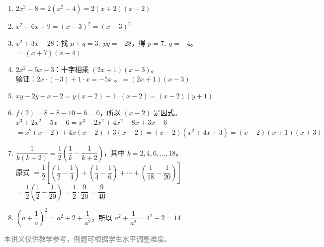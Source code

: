 \documentclass[12pt, a4paper]{ctexart}
\begin{document}
\vspace{10pt}
\begin{knowledgebox}[参考答案]
\begin{enumerate}[leftmargin=18pt, label=\textbf{\arabic*.}, itemsep=6pt]
\item $2x^2 - 8 = 2(x^2-4) = \boxed{2(x+2)(x-2)}$

\item $x^2 - 6x + 9 = (x-3)^2 = \boxed{(x-3)^2}$

\item $x^2 + 3x - 28$：找 $p+q=3,\; pq=-28$，得 $p=7,\; q=-4$。\\
$= \boxed{(x+7)(x-4)}$

\item $2x^2 - 5x - 3$：十字相乘 $(2x+1)(x-3)$。\\
验证：$2x\cdot(-3)+1\cdot x = -5x$ \checkmark。\quad $= \boxed{(2x+1)(x-3)}$

\item $xy - 2y + x - 2 = y(x-2) + 1\cdot(x-2) = \boxed{(x-2)(y+1)}$

\item $f(2) = 8+8-10-6 = 0$，所以 $(x-2)$ 是因式。\\
$x^3+2x^2-5x-6 = x^3-2x^2+4x^2-8x+3x-6$\\
$= x^2(x-2)+4x(x-2)+3(x-2) = (x-2)(x^2+4x+3) = \boxed{(x-2)(x+1)(x+3)}$

\item $\dfrac{1}{k(k+2)} = \dfrac{1}{2}\!\left(\dfrac{1}{k}-\dfrac{1}{k+2}\right)$，其中 $k=2,4,6,\ldots,18$。\\
原式 $= \dfrac{1}{2}\left[\left(\dfrac{1}{2}-\dfrac{1}{4}\right)+\left(\dfrac{1}{4}-\dfrac{1}{6}\right)+\cdots+\left(\dfrac{1}{18}-\dfrac{1}{20}\right)\right]$\\
$= \dfrac{1}{2}\left(\dfrac{1}{2} - \dfrac{1}{20}\right) = \dfrac{1}{2} \cdot \dfrac{9}{20} = \boxed{\dfrac{9}{40}}$

\item $\left(a+\dfrac{1}{a}\right)^2 = a^2 + 2 + \dfrac{1}{a^2}$，所以 $a^2+\dfrac{1}{a^2} = 4^2 - 2 = \boxed{14}$
\end{enumerate}
\end{knowledgebox}

\vfill
\begin{center}
\small\textcolor{gray}{本讲义仅供教学参考，例题可根据学生水平调整难度。}
\end{center}
\end{document}
